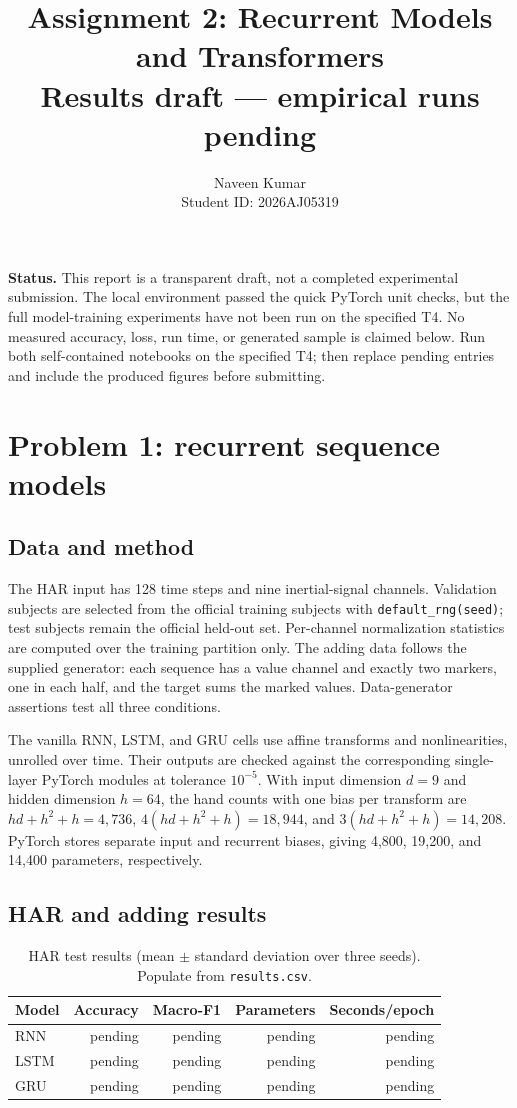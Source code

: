 \documentclass[11pt,a4paper]{article}
\title{Assignment 2: Recurrent Models and Transformers\\\large Results draft — empirical runs pending}
\author{Naveen Kumar\\Student ID: 2026AJ05319}
\date{}
\begin{document}
\maketitle

\noindent\textbf{Status.} This report is a transparent draft, not a completed experimental submission. The local environment passed the quick PyTorch unit checks, but the full model-training experiments have not been run on the specified T4. No measured accuracy, loss, run time, or generated sample is claimed below. Run both self-contained notebooks on the specified T4; then replace pending entries and include the produced figures before submitting.

\section{Problem 1: recurrent sequence models}
\subsection{Data and method}
The HAR input has 128 time steps and nine inertial-signal channels. Validation subjects are selected from the official training subjects with \texttt{default\_rng(seed)}; test subjects remain the official held-out set. Per-channel normalization statistics are computed over the training partition only. The adding data follows the supplied generator: each sequence has a value channel and exactly two markers, one in each half, and the target sums the marked values. Data-generator assertions test all three conditions.

The vanilla RNN, LSTM, and GRU cells use affine transforms and nonlinearities, unrolled over time. Their outputs are checked against the corresponding single-layer PyTorch modules at tolerance \(10^{-5}\). With input dimension \(d=9\) and hidden dimension \(h=64\), the hand counts with one bias per transform are \(hd+h^2+h=4{,}736\), \(4(hd+h^2+h)=18{,}944\), and \(3(hd+h^2+h)=14{,}208\). PyTorch stores separate input and recurrent biases, giving 4,800, 19,200, and 14,400 parameters, respectively.

\subsection{HAR and adding results}
\begin{table}[h]
\centering
\caption{HAR test results (mean \(\pm\) standard deviation over three seeds). Populate from \texttt{results.csv}.}
\begin{tabular}{lrrrr}
\toprule
Model & Accuracy & Macro-F1 & Parameters & Seconds/epoch\\
\midrule
RNN & pending & pending & pending & pending\\
LSTM & pending & pending & pending & pending\\
GRU & pending & pending & pending & pending\\
\bottomrule
\end{tabular}
\end{table}
\end{document}
